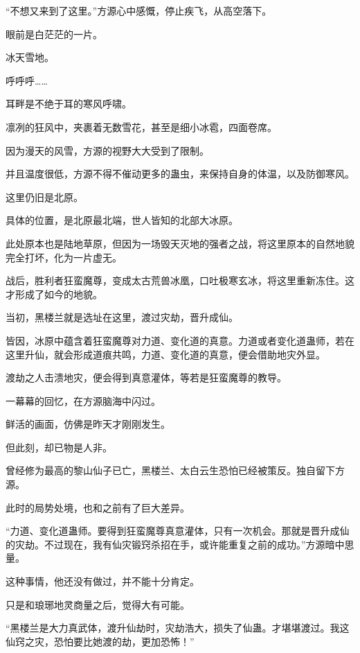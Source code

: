 
\begin{this_body}



“不想又来到了这里。”方源心中感慨，停止疾飞，从高空落下。

眼前是白茫茫的一片。

冰天雪地。

呼呼呼……

耳畔是不绝于耳的寒风呼啸。

凛冽的狂风中，夹裹着无数雪花，甚至是细小冰雹，四面卷席。

因为漫天的风雪，方源的视野大大受到了限制。

并且温度很低，方源不得不催动更多的蛊虫，来保持自身的体温，以及防御寒风。

这里仍旧是北原。

具体的位置，是北原最北端，世人皆知的北部大冰原。

此处原本也是陆地草原，但因为一场毁天灭地的强者之战，将这里原本的自然地貌完全打坏，化为一片虚无。

战后，胜利者狂蛮魔尊，变成太古荒兽冰凰，口吐极寒玄冰，将这里重新冻住。这才形成了如今的地貌。

当初，黑楼兰就是选址在这里，渡过灾劫，晋升成仙。

皆因，冰原中蕴含着狂蛮魔尊对力道、变化道的真意。力道或者变化道蛊师，若在这里升仙，就会形成道痕共鸣，力道、变化道的真意，便会借助地灾外显。

渡劫之人击溃地灾，便会得到真意灌体，等若是狂蛮魔尊的教导。

一幕幕的回忆，在方源脑海中闪过。

鲜活的画面，仿佛是昨天才刚刚发生。

但此刻，却已物是人非。

曾经修为最高的黎山仙子已亡，黑楼兰、太白云生恐怕已经被策反。独自留下方源。

此时的局势处境，也和之前有了巨大差异。

“力道、变化道蛊师。要得到狂蛮魔尊真意灌体，只有一次机会。那就是晋升成仙的灾劫。不过现在，我有仙灾锻窍杀招在手，或许能重复之前的成功。”方源暗中思量。

这种事情，他还没有做过，并不能十分肯定。

只是和琅琊地灵商量之后，觉得大有可能。

“黑楼兰是大力真武体，渡升仙劫时，灾劫浩大，损失了仙蛊。才堪堪渡过。我这仙窍之灾，恐怕要比她渡的劫，更加恐怖！”


\end{this_body}
